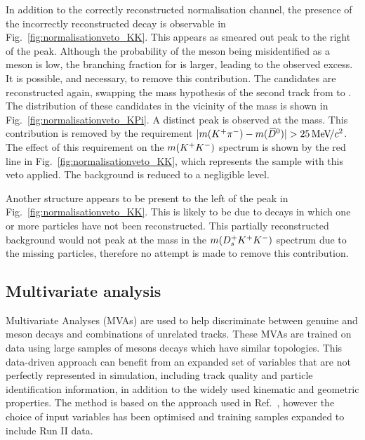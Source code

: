 In addition to the correctly reconstructed normalisation channel, the presence of the incorrectly reconstructed \decay{\Bp}{\Dsp(\decay{\Dzb}{\Kp\pim})} decay is observable in Fig.~\ref{fig:normalisationveto_KK}. This appears as smeared out peak to the right of the \Dzb peak. Although the probability of the \pim meson being misidentified as a \Km meson is low, the branching fraction for \decay{\Dzb}{\Kp\pim} is larger, leading to the observed excess. It is possible, and necessary, to remove this contribution. The \Kp\Km candidates are reconstructed again, swapping the mass hypothesis of the second track from \Km to \pim. The distribution of these candidates in the vicinity of the \Dzb mass is shown in Fig.~\ref{fig:normalisationveto_KPi}. A distinct peak is observed at the \Dzb mass. This contribution is removed by the requirement $|m({{K}^+}{{\pi}^-}) - m({{\kern 0.2em\overline{\kern -0.2em D}{}}{}^0})| > 25 {\mathrm{\,Me\kern -0.1em V\!/}c^2}$. The effect of this requirement on the $m({{K}^+}{{K}^-})$ spectrum is shown by the red line in Fig.~\ref{fig:normalisationveto_KK}, which represents the sample with this veto applied. The \decay{\Bp}{\Dsp(\decay{\Dzb}{\Kp\pim})} background is reduced to a negligible level.

Another structure appears to be present to the left of the \Dzb peak in Fig.~\ref{fig:normalisationveto_KK}. This is likely to be due to  decays in which one or more particles have not been reconstructed. This partially reconstructed background would not peak at the \Bp mass in the $m({{D}^+_{s}}{{K}^+}{{K}^-})$ spectrum due to the missing particles, therefore no attempt is made to remove this contribution.


\subsection{Multivariate analysis}

Multivariate Analyses (MVAs) are used to help discriminate between genuine \Dsp and \phiz meson decays and combinations of unrelated tracks. 
These MVAs are trained on data using large samples of \B mesons decays which have similar topologies. 
This data-driven approach can benefit from an expanded set of variables that are not perfectly represented in simulation, including track quality and particle identification information, in addition to the widely used kinematic and geometric properties.
The method is based on the approach used in Ref.~\cite{LHCb-PAPER-2012-050}, however the choice of input variables has been optimised and training samples expanded to include Run II data.

